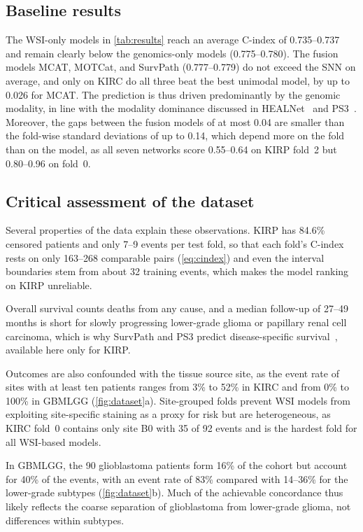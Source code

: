 \documentclass[10pt,twocolumn,letterpaper]{article}
\begin{document}
\subsection{Baseline results}
\label{sec:results}

The WSI-only models in \cref{tab:results} reach an average C-index of 0.735--0.737 and remain clearly below the genomics-only models (0.775--0.780). The fusion models MCAT, MOTCat, and SurvPath (0.777--0.779) do not exceed the SNN on average, and only on KIRC do all three beat the best unimodal model, by up to 0.026 for MCAT. The prediction is thus driven predominantly by the genomic modality, in line with the modality dominance discussed in HEALNet~\cite{hemker2024healnet} and PS3~\cite{raza2025ps3}. Moreover, the gaps between the fusion models of at most 0.04 are smaller than the fold-wise standard deviations of up to 0.14, which depend more on the fold than on the model, as all seven networks score 0.55--0.64 on KIRP fold~2 but 0.80--0.96 on fold~0.

\subsection{Critical assessment of the dataset}
\label{sec:critique}

Several properties of the data explain these observations. KIRP has 84.6\% censored patients and only 7--9 events per test fold, so that each fold's C-index rests on only 163--268 comparable pairs (\cref{eq:cindex}) and even the interval boundaries stem from about 32 training events, which makes the model ranking on KIRP unreliable.

Overall survival counts deaths from any cause, and a median follow-up of 27--49 months is short for slowly progressing lower-grade glioma or papillary renal cell carcinoma, which is why SurvPath and PS3 predict disease-specific survival~\cite{jaume2024survpath,raza2025ps3}, available here only for KIRP.

Outcomes are also confounded with the tissue source site, as the event rate of sites with at least ten patients ranges from 3\% to 52\% in KIRC and from 0\% to 100\% in GBMLGG (\cref{fig:dataset}a). Site-grouped folds prevent WSI models from exploiting site-specific staining as a proxy for risk but are heterogeneous, as KIRC fold~0 contains only site B0 with 35 of 92 events and is the hardest fold for all WSI-based models.

In GBMLGG, the 90 glioblastoma patients form 16\% of the cohort but account for 40\% of the events, with an event rate of 83\% compared with 14--36\% for the lower-grade subtypes (\cref{fig:dataset}b). Much of the achievable concordance thus likely reflects the coarse separation of glioblastoma from lower-grade glioma, not differences within subtypes.
\end{document}
